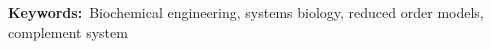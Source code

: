 \documentclass[12pt]{article}
\begin{document}



\vspace{0.1in}
{\noindent \textbf{Keywords:}~Biochemical engineering, systems biology, reduced order models, complement system}

\pagebreak

\setcounter{page}{1}

\linenumbers
\end{document}
